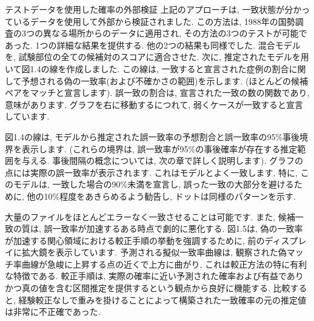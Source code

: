 \documentclass[10pt,dvipdfmx,a4]{beamer}
\begin{document}

\begin{frame}{テストデータを使用した確率の外部検証}
上記のアプローチは, 一致状態が分かっているデータを使用して外部から検証されました.
この方法は, 1988年の国勢調査の3つの異なる場所からのデータに適用され, その方法の3つのテストが可能であった.
1つの詳細な結果を提供する.
他の2つの結果も同様でした.
混合モデルを, 試験部位の全ての候補対のスコアに適合させた.
次に, 推定されたモデルを用いて図1.4の線を作成しました.
この線は, 一致すると宣言された症例の割合に関して予想される偽の一致率(および不確かさの範囲)を示します.
(ほとんどの候補ペアをマッチと宣言します).
誤一致の割合は, 宣言された一致の数の関数であり, 意味があります.
グラフを右に移動するにつれて, 弱くケースが一致すると宣言しています.

図1.4の線は, モデルから推定された誤一致率の予想割合と誤一致率の95\%事後境界を表示します.
(これらの境界は, 誤一致率が95\%の事後確率が存在する推定範囲を与える.
事後間隔の概念については, 次の章で詳しく説明します).
グラフの点には実際の誤一致率が表示されます.
これはモデルとよく一致します.
特に, このモデルは, 一致した場合の90\%未満を宣言し, 誤った一致の大部分を避けるために, 他の10\%程度をあきらめるよう勧告し, ドットは同様のパターンを示す.
\end{frame}


\begin{frame}
大量のファイルをほとんどエラーなく一致させることは可能です.
また, 候補一致の質は, 誤一致率が加速するある時点で劇的に悪化する.
図1.5は, 偽の一致率が加速する関心領域における較正手順の挙動を強調するために, 前のディスプレイに拡大鏡を表示しています.
予測される擬似一致率曲線は, 観察された偽マッチ率曲線が急峻に上昇する点の近くで上方に曲がり, これは較正方法の特に有利な特徴である.
較正手順は, 実際の確率に近い予測された確率および有益でありかつ真の値を含む区間推定を提供するという観点から良好に機能する.
比較すると, 経験較正なしで重みを掛けることによって構築された一致確率の元の推定値は非常に不正確であった.
\end{frame}

\end{document}
